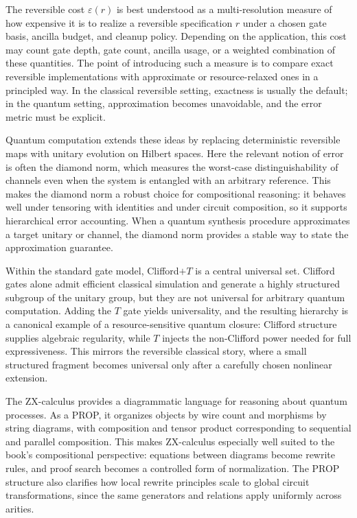 The reversible cost \(\varepsilon(r)\) is best understood as a multi-resolution measure of how expensive it is to realize a reversible specification \(r\) under a chosen gate basis, ancilla budget, and cleanup policy. Depending on the application, this cost may count gate depth, gate count, ancilla usage, or a weighted combination of these quantities. The point of introducing such a measure is to compare exact reversible implementations with approximate or resource-relaxed ones in a principled way. In the classical reversible setting, exactness is usually the default; in the quantum setting, approximation becomes unavoidable, and the error metric must be explicit.

Quantum computation extends these ideas by replacing deterministic reversible maps with unitary evolution on Hilbert spaces. Here the relevant notion of error is often the diamond norm, which measures the worst-case distinguishability of channels even when the system is entangled with an arbitrary reference. This makes the diamond norm a robust choice for compositional reasoning: it behaves well under tensoring with identities and under circuit composition, so it supports hierarchical error accounting. When a quantum synthesis procedure approximates a target unitary or channel, the diamond norm provides a stable way to state the approximation guarantee.

Within the standard gate model, Clifford\(+T\) is a central universal set. Clifford gates alone admit efficient classical simulation and generate a highly structured subgroup of the unitary group, but they are not universal for arbitrary quantum computation. Adding the \(T\) gate yields universality, and the resulting hierarchy is a canonical example of a resource-sensitive quantum closure: Clifford structure supplies algebraic regularity, while \(T\) injects the non-Clifford power needed for full expressiveness. This mirrors the reversible classical story, where a small structured fragment becomes universal only after a carefully chosen nonlinear extension.

The ZX-calculus provides a diagrammatic language for reasoning about quantum processes. As a PROP, it organizes objects by wire count and morphisms by string diagrams, with composition and tensor product corresponding to sequential and parallel composition. This makes ZX-calculus especially well suited to the book's compositional perspective: equations between diagrams become rewrite rules, and proof search becomes a controlled form of normalization. The PROP structure also clarifies how local rewrite principles scale to global circuit transformations, since the same generators and relations apply uniformly across arities.


